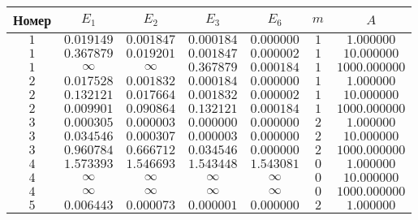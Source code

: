 \documentclass[14pt,a4paper]{extarticle}
\newcommand{\1}{\mathbbm{1}}
\begin{document}
\begin{table}[h!] 
    \begin{center} 
    \begin{tabular}{|c|c|c|c|c|c|c|} 
    \hline 
    Номер  & $E_1$ & $E_2$ & $E_3$ & $E_6$ & $m$ & $A$ \\ \hline
     $1$ &  $0.019149$ & $0.001847$ & $0.000184$ & $0.000000$ & $1$ & $1.000000$ \\ \hline 
    
     $1$ &  $0.367879$ & $0.019201$ & $0.001847$ & $0.000002$ & $1$ & $10.000000$ \\ \hline 
    
     $1$ &  $\infty$ & $\infty$ & $0.367879$ & $0.000184$ & $1$ & $1000.000000$ \\ \hline 
    
     $2$ &  $0.017528$ & $0.001832$ & $0.000184$ & $0.000000$ & $1$ & $1.000000$ \\ \hline 
    
     $2$ &  $0.132121$ & $0.017664$ & $0.001832$ & $0.000002$ & $1$ & $10.000000$ \\ \hline 
    
     $2$ &  $0.009901$ & $0.090864$ & $0.132121$ & $0.000184$ & $1$ & $1000.000000$ \\ \hline 
    
     $3$ &  $0.000305$ & $0.000003$ & $0.000000$ & $0.000000$ & $2$ & $1.000000$ \\ \hline 
    
     $3$ &  $0.034546$ & $0.000307$ & $0.000003$ & $0.000000$ & $2$ & $10.000000$ \\ \hline 
    
     $3$ &  $0.960784$ & $0.666712$ & $0.034546$ & $0.000000$ & $2$ & $1000.000000$ \\ \hline 
    
     $4$ &  $1.573393$ & $1.546693$ & $1.543448$ & $1.543081$ & $0$ & $1.000000$ \\ \hline 
    
     $4$ &  $\infty$ & $\infty$ & $\infty$ & $\infty$ & $0$ & $10.000000$ \\ \hline 
    
     $4$ &  $\infty$ & $\infty$ & $\infty$ & $\infty$ & $0$ & $1000.000000$ \\ \hline 
    
     $5$ &  $0.006443$ & $0.000073$ & $0.000001$ & $0.000000$ & $2$ & $1.000000$ \\ \hline 
    

\end{tabular}
\end{center}
\end{table}
\end{document}
